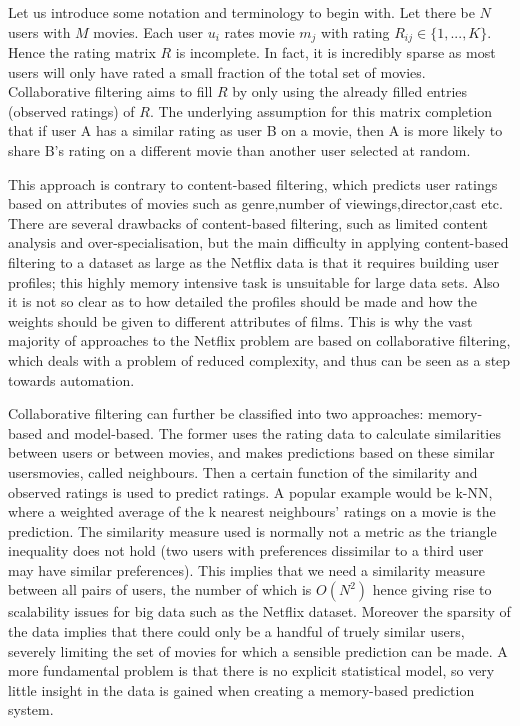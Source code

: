 \documentclass{article}
\theoremstyle{plain}
\begin{document}
Let us introduce some notation and terminology to begin with. Let there be $N$ users with $M$ movies. Each user $u_i$ rates movie $m_j$ with rating $R_{ij} \in \{1,...,K\}$. Hence the rating matrix $R$ is incomplete. In fact, it is incredibly sparse as most users will only have rated a small fraction of the total set of movies. Collaborative filtering aims to fill $R$ by only using the already filled entries (observed ratings) of $R$. The underlying assumption for this matrix completion that if user A has a similar rating as user B on a movie, then A is more likely to share B's rating on a different movie than another user selected at random. 

This approach is contrary to content-based filtering, which predicts user ratings based on attributes of movies such as genre,number of viewings,director,cast etc. There are several drawbacks of content-based filtering, such as limited content analysis and over-specialisation, but the main difficulty in applying content-based filtering to a dataset as large as the Netflix data is that it requires building user profiles; this highly memory intensive task is unsuitable for large data sets. Also it is not so clear as to how detailed the profiles should be made and how the weights should be given to different attributes of films. This is why the vast majority of approaches to the Netflix problem are based on collaborative filtering, which deals with a problem of reduced complexity, and thus can be seen as a step towards automation.

Collaborative filtering can further be classified into two approaches: memory-based and model-based. The former uses the rating data  to calculate similarities between users or between movies, and makes predictions based on these similar users\/movies, called neighbours. Then a certain function of the similarity and observed ratings is used to predict ratings. A popular example would be k-NN, where a weighted average of the k nearest neighbours' ratings on a movie is the prediction. The similarity measure used is normally not a metric as the triangle inequality does not hold (two users with preferences dissimilar to a third user may have similar preferences). This implies that we need a similarity measure between all pairs of users, the number of which is $O(N^2)$ hence giving rise to scalability issues for big data such as the Netflix dataset. Moreover the sparsity of the data implies that there could only be a handful of truely similar users, severely limiting the set of movies for which a sensible prediction can be made. A more fundamental problem is that there is no explicit statistical model, so very little insight in the data is gained when creating a memory-based prediction system. 
\end{document}
